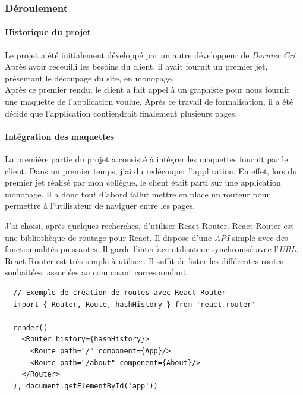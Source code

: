 \documentclass[12pt,a4paper]{article}
\begin{document}
  \bigskip

  \subsubsection{Déroulement}\label{duxe9roulement}

  \bigskip

  \paragraph{Historique du projet}\label{historique-du-projet}

  \bigskip

  Le projet a été initialement développé par un autre développeur de
  \emph{Dernier Cri}. Après avoir receuilli les besoins du client, il
  avait fournit un premier jet, présentant le découpage du site, en
  monopage.\\
  Après ce premier rendu, le client a fait appel à un graphiste pour nous
  fournir une maquette de l'application voulue. Après ce travail de
  formalisation, il a été décidé que l'application contiendrait finalement
  plusieurs pages.

  \bigskip

  \paragraph{Intégration des
  maquettes}\label{intuxe9gration-des-maquettes}

  \bigskip

  La première partie du projet a consisté à intégrer les maquettes fournit
  par le client. Dans un premier temps, j'ai du redécouper l'application.
  En effet, lors du premier jet réalisé par mon collègue, le client était
  parti sur une application monopage. Il a donc tout d'abord fallut mettre
  en place un routeur pour permettre à l'utilisateur de naviguer entre les
  pages.

  \bigskip

  J'ai choisi, après quelques recherches, d'utiliser React Router.
  \href{https://github.com/ReactTraining/react-router}{React Router} est
  une bibliothèque de routage pour React. Il dispose d'une \emph{API}
  simple avec des fonctionnalités puissantes. Il garde l'interface
  utilisateur synchronisé avec l'\emph{URL}. React Router est très simple
  à utiliser. Il suffit de lister les différentes routes souhaitées,
  associées au composant correspondant.

  \begin{verbatim}
  // Exemple de création de routes avec React-Router
  import { Router, Route, hashHistory } from 'react-router'

  render((
    <Router history={hashHistory}>
      <Route path="/" component={App}/>
      <Route path="/about" component={About}/>
    </Router>
  ), document.getElementById('app'))
  \end{verbatim}
\end{document}
